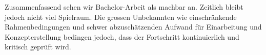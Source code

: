 \noindent
Zusammenfassend sehen wir Bachelor-Arbeit als machbar an. Zeitlich bleibt jedoch nicht viel Spielraum. Die grossen Unbekannten wie  einschränkende Rahmenbedingungen und schwer abzuschätzenden Aufwand für Einarbeitung und Konzepterstellung bedingen jedoch, dass der Fortschritt kontinuierlich und kritisch geprüft wird.